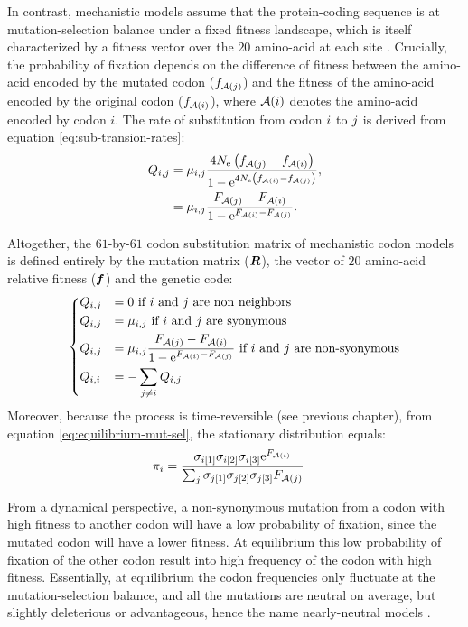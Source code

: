 In contrast, mechanistic models assume that the protein-coding sequence is at mutation-selection balance under a fixed fitness landscape, which is itself characterized by a fitness vector over the $20$ amino-acid at each site \citep{Yang2008, Halpern1998, Rodrigue2010}.
Crucially, the probability of fixation depends on the difference of fitness between the amino-acid encoded by the mutated \gls{codon} ($f_{\mathcal{A}({j})}$) and the fitness of the amino-acid encoded by the original \gls{codon} ($f_{\mathcal{A}({i})}$), where $\mathcal{A}({i})$ denotes the amino-acid encoded by codon $i$.
The rate of \gls{substitution} from \gls{codon} ${i}$ to ${j}$ is derived from equation \ref{eq:sub-transion-rates}:
\begin{align}
Q_{{i}, {j}} & = \mu_{{i}, {j}} \dfrac{4 N_{\textrm{e}} \left({f_{\mathcal{A}({j})} - f_{\mathcal{A}({i})}}\right)}{{1 - \mathrm{e}^{4 N_{\textrm{e}} \left({f_{\mathcal{A}({i})} - f_{\mathcal{A}({j})}}\right)} }}, \\
& = \mu_{{i}, {j}} \dfrac{F_{\mathcal{A}({j})} - F_{\mathcal{A}({i})}}{1 - \mathrm{e}^{F_{\mathcal{A}({i})} - F_{\mathcal{A}({j})}} }.
\end{align}

Altogether, the $61$-by-$61$ codon substitution matrix of mechanistic codon models is defined entirely by the mutation matrix ($\bm{R}$), the vector of $20$ amino-acid relative fitness ($\bm{f}$) and the genetic code:
\begin{equation}
\begin{dcases}
Q_{{i}, {j}} & = 0 \text{ if ${i}$ and ${j}$ are non neighbors} \\
Q_{{i}, {j}} & = \mu_{{i}, {j}} \text{ if ${i}$ and ${j}$ are syonymous} \\
Q_{{i}, {j}} & = \mu_{{i}, {j}} \dfrac{F_{\mathcal{A}({j})} - F_{\mathcal{A}({i})}}{1 - \mathrm{e}^{F_{\mathcal{A}({i})} - F_{\mathcal{A}({j})}} } \text{ if ${i}$ and ${j}$ are non-syonymous} \\
Q_{{i}, {i}} & = - \sum_{{j} \neq {i}} Q_{{i}, {j}}
\end{dcases}
\label{eq:propensities-models}
\end{equation}
Moreover, because the process is time-reversible (see previous chapter), from equation \ref{eq:equilibrium-mut-sel}, the stationary distribution equals:
\begin{align}
\pi_{{i}} & = \dfrac{\sigma_{{i}[1]}\sigma_{{i}[2]}\sigma_{{i}[3]}\mathrm{e}^{F_{\mathcal{A}({i})}}}{\sum_{{j}}\sigma_{{j}[1]}\sigma_{{j}[2]}\sigma_{{j}[3]}F_{\mathcal{A}({j})} }
\end{align}

From a dynamical perspective, a non-synonymous mutation from a \gls{codon} with high fitness to another codon will have a low probability of fixation, since the mutated \gls{codon} will have a lower fitness.
At equilibrium this low probability of fixation of the other \gls{codon} result into high frequency of the \gls{codon} with high fitness.
Essentially, at equilibrium the \gls{codon} frequencies only fluctuate at the mutation-selection balance, and all the mutations are \gls{neutral} on average, but slightly deleterious or advantageous, hence the name \gls{nearly-neutral} models \citep{Ohta1973, Ohta1992, Rodrigue2016}.

